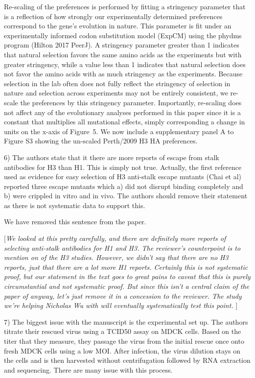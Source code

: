 \documentclass[11pt, oneside]{article}   	%
\newcommand{\comment}[1]{{\color{red}[\textsl{#1}]}}
\newcommand{\response}[1]{{\color{black}#1}}
\begin{document}
\response{Re-scaling of the preferences is performed by fitting a stringency parameter that is a reflection of how strongly our experimentally determined preferences correspond to the gene's evolution in nature.
This parameter is fit under an experimentally informed codon substitution model (ExpCM) using the phydms program (Hilton 2017 PeerJ).
A stringency parameter greater than 1 indicates that natural selection favors the same amino acids as the experiments but with greater stringency, while a value less than 1 indicates that natural selection does not favor the amino acids with as much stringency as the experiments.
Because selection in the lab often does not fully reflect the stringency of selection in nature and selection across experiments may not be entirely consistent, we re-scale the preferences by this stringency parameter.
Importantly, re-scaling does not affect any of the evolutionary analyses performed in this paper since it is a constant that multiplies all mutational effects, simply corresponding a change in units on the x-axis of Figure~5.
We now include a supplementary panel A to Figure S3 showing the un-scaled Perth/2009 H3 HA preferences.
}

6) The authors state that it there are more reports of escape from stalk antibodies for H3 than H1. This is simply not true. Actually, the first reference used as evidence for easy selection of H3 anti-stalk escape mutants (Chai et al) reported three escape mutants which a) did not disrupt binding completely and b) were crippled in vitro and in vivo. The authors should remove their statement as there is not systematic data to support this. 

\response{We have removed this sentence from the paper.}

\comment{We looked at this pretty carefully, and there are definitely more reports of selecting anti-stalk antibodies for H1 and H3.
The reviewer's counterpoint is to mention on of the H3 studies. 
However, we didn't say that there are no H3 reports, just that there are a lot more H1 reports.
Certainly this is not systematic proof, but our statement in the text goes to great pains to caveat that this is purely circumstantial and not systematic proof.
But since this isn't a central claim of the paper of anyway, let's just remove it in a concession to the reviewer.
The study we're helping Nicholas Wu with will eventually systematically test this point.
}

7) The biggest issue with the manuscript is the experimental set up. The authors titrate their rescued virus using a TCID50 assay on MDCK cells. Based on the titer that they measure, they passage the virus from the initial rescue once onto fresh MDCK cells using a low MOI. After infection, the virus dilution stays on the cells and is then harvested without centrifugation followed by RNA extraction and sequencing. There are many issue with this process. 
\end{document}
